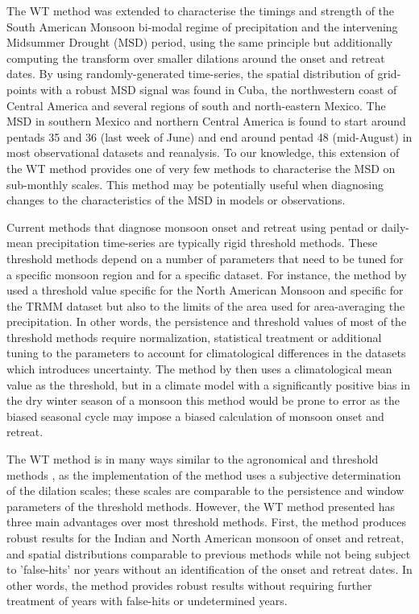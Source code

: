 The WT method was extended to characterise the timings and strength of the South American Monsoon bi-modal regime of precipitation and the intervening  Midsummer Drought (MSD) period, using the same principle but additionally computing the transform over smaller dilations around the onset and retreat dates.  By using randomly-generated time-series, the spatial distribution of grid-points with a robust MSD signal was found in Cuba, the northwestern coast of Central America and several regions of south and north-eastern Mexico.  The MSD in southern Mexico and northern Central America is found to start around pentads 35 and 36 (last week of June) and end around pentad 48 (mid-August) in most observational datasets and reanalysis. To our knowledge, this extension of the WT method provides one of very few methods to characterise the MSD on sub-monthly scales.
This method may be potentially useful when diagnosing changes to the characteristics of the MSD in models or observations. 


Current methods that diagnose monsoon onset and retreat using pentad or daily-mean precipitation time-series are typically rigid threshold methods. These threshold methods depend on a number of parameters that need to be tuned for a specific monsoon region and for a specific dataset. 
For instance, the method by  used a threshold value specific for the North American Monsoon and specific for the TRMM dataset but also to the limits of the area used for area-averaging the precipitation. In other words, the persistence and threshold values of most of the threshold methods require normalization, statistical treatment or additional tuning to the parameters to account for climatological differences in the datasets which introduces uncertainty. The method by  then uses a climatological mean value as the threshold, but in a climate model with a significantly positive bias in the dry winter season of a monsoon this method would be prone to error as the biased seasonal cycle may impose a biased calculation of monsoon onset and retreat. 



The WT method is in many ways similar to the agronomical and threshold methods \citep[e.g.][]{liebmann2001interannual,moron2014interannual}, as the implementation of the method uses a subjective determination of the dilation scales; these scales are comparable to the persistence and window parameters of the threshold methods. However, the WT method presented has three main advantages over most threshold methods. First, the method produces robust results for the Indian and North American monsoon of onset and retreat, and spatial distributions comparable to previous methods \citep{moron2014interannual} while not being subject to 'false-hits' nor years without an identification of the onset and retreat dates. In other words, the method provides robust results without requiring further treatment of years with false-hits or undetermined years. 

